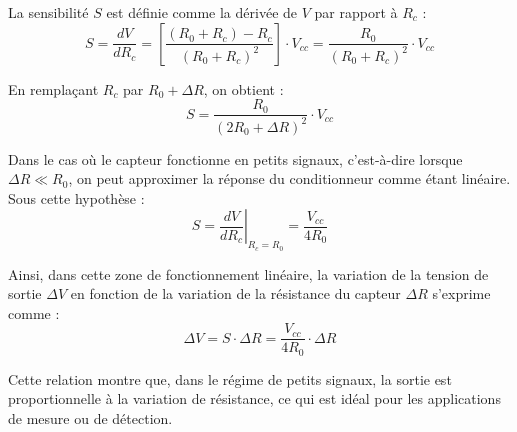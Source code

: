 La sensibilité \( S \) est définie comme la dérivée de \( V \) par rapport à \( R_c \) :
\[
S = \frac{dV}{dR_c} = \left[ \frac{(R_0 + R_c) - R_c}{(R_0 + R_c)^2} \right] \cdot V_{cc} = \frac{R_0}{(R_0 + R_c)^2} \cdot V_{cc}
\]

En remplaçant \( R_c \) par \( R_0 + \Delta R \), on obtient :
\[
S = \frac{R_0}{(2R_0 + \Delta R)^2} \cdot V_{cc}
\]

Dans le cas où le capteur fonctionne en petits signaux, c’est-à-dire lorsque 
\( \Delta R \ll R_0 \), on peut approximer la réponse du conditionneur comme 
étant linéaire. Sous cette hypothèse :
\[
S = \left. \frac{dV}{dR_c} \right|_{R_c = R_0} = \frac{V_{cc}}{4R_0}
\]

Ainsi, dans cette zone de fonctionnement linéaire, la variation de la tension de 
sortie \( \Delta V \) en fonction de la variation de la résistance du capteur 
\( \Delta R \) s’exprime comme :
\[
\Delta V = S \cdot \Delta R = \frac{V_{cc}}{4R_0} \cdot \Delta R
\]

Cette relation montre que, dans le régime de petits signaux, la sortie est 
proportionnelle à la variation de résistance, ce qui est idéal pour les 
applications de mesure ou de détection.
